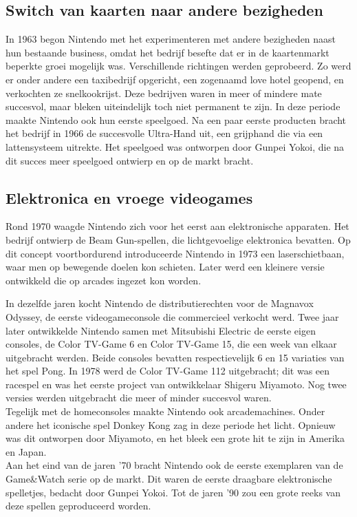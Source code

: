 \documentclass{article}
\begin{document}
\subsection{Switch van kaarten naar andere bezigheden}
In 1963 begon Nintendo met het experimenteren met andere bezigheden naast hun bestaande business, omdat het bedrijf besefte dat er in de kaartenmarkt beperkte groei mogelijk was. Verschillende richtingen werden geprobeerd. Zo werd er onder andere een taxibedrijf opgericht, een zogenaamd love hotel geopend, en verkochten ze snelkookrijst. Deze bedrijven waren in meer of mindere mate succesvol, maar bleken uiteindelijk toch niet permanent te zijn. 
In deze periode maakte Nintendo ook hun eerste speelgoed. Na een paar eerste producten bracht het bedrijf in 1966 de succesvolle Ultra-Hand uit, een grijphand die via een lattensysteem uitrekte. Het speelgoed was ontworpen door Gunpei Yokoi, die na dit succes meer speelgoed ontwierp en op de markt bracht.


\subsection{Elektronica en vroege videogames}
Rond 1970 waagde Nintendo zich voor het eerst aan elektronische apparaten. Het bedrijf ontwierp de Beam Gun-spellen, die lichtgevoelige elektronica bevatten. Op dit concept voortbordurend introduceerde Nintendo in 1973 een laserschietbaan, waar men op bewegende doelen kon schieten. Later werd een kleinere versie ontwikkeld die op arcades ingezet kon worden.

In dezelfde jaren kocht Nintendo de distributierechten voor de Magnavox Odyssey, de eerste videogameconsole die commercieel verkocht werd. Twee jaar later ontwikkelde Nintendo samen met Mitsubishi Electric de eerste eigen consoles, de Color TV-Game 6 en Color TV-Game 15, die een week van elkaar uitgebracht werden. Beide consoles bevatten respectievelijk 6 en 15 variaties van het spel Pong. In 1978 werd de Color TV-Game 112 uitgebracht; dit was een racespel en was het eerste project van ontwikkelaar Shigeru Miyamoto. Nog twee versies werden uitgebracht die meer of minder succesvol waren. 
\\ 
Tegelijk met de homeconsoles maakte Nintendo ook arcademachines. Onder andere het iconische spel Donkey Kong zag in deze periode het licht. Opnieuw was dit ontworpen door Miyamoto, en het bleek een grote hit te zijn in Amerika en Japan.
\\ 
Aan het eind van de jaren '70 bracht Nintendo ook de eerste exemplaren van de Game\&Watch serie op de markt. Dit waren de eerste draagbare elektronische spelletjes, bedacht door Gunpei Yokoi. Tot de jaren '90 zou een grote reeks van deze spellen geproduceerd worden.
\end{document}

